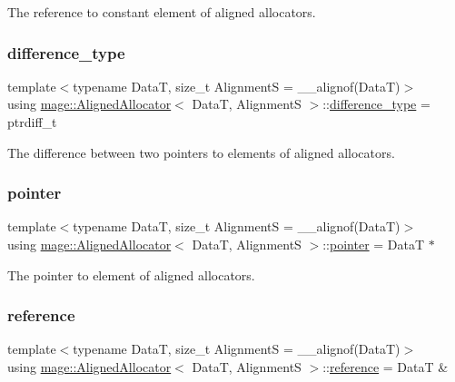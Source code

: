 The reference to constant element of aligned allocators. \hypertarget{structmage_1_1_aligned_allocator_aa66abd74c38e5e565fca600a066a5915}{}\label{structmage_1_1_aligned_allocator_aa66abd74c38e5e565fca600a066a5915} 
\subsubsection{\texorpdfstring{difference\+\_\+type}{difference\_type}}
{\footnotesize\ttfamily template$<$typename DataT, size\+\_\+t AlignmentS = \+\_\+\+\_\+alignof(\+Data\+T)$>$ \\
using \hyperlink{structmage_1_1_aligned_allocator}{mage\+::\+Aligned\+Allocator}$<$ DataT, AlignmentS $>$\+::\hyperlink{structmage_1_1_aligned_allocator_aa66abd74c38e5e565fca600a066a5915}{difference\+\_\+type} =  ptrdiff\+\_\+t}

The difference between two pointers to elements of aligned allocators. \hypertarget{structmage_1_1_aligned_allocator_a4f6b515d4d9d27a8b9e27376302034c4}{}\label{structmage_1_1_aligned_allocator_a4f6b515d4d9d27a8b9e27376302034c4} 
\subsubsection{\texorpdfstring{pointer}{pointer}}
{\footnotesize\ttfamily template$<$typename DataT, size\+\_\+t AlignmentS = \+\_\+\+\_\+alignof(\+Data\+T)$>$ \\
using \hyperlink{structmage_1_1_aligned_allocator}{mage\+::\+Aligned\+Allocator}$<$ DataT, AlignmentS $>$\+::\hyperlink{structmage_1_1_aligned_allocator_a4f6b515d4d9d27a8b9e27376302034c4}{pointer} =  DataT $\ast$}

The pointer to element of aligned allocators. \hypertarget{structmage_1_1_aligned_allocator_a95fd7625632a0143d72ad02ca520be4d}{}\label{structmage_1_1_aligned_allocator_a95fd7625632a0143d72ad02ca520be4d} 
\subsubsection{\texorpdfstring{reference}{reference}}
{\footnotesize\ttfamily template$<$typename DataT, size\+\_\+t AlignmentS = \+\_\+\+\_\+alignof(\+Data\+T)$>$ \\
using \hyperlink{structmage_1_1_aligned_allocator}{mage\+::\+Aligned\+Allocator}$<$ DataT, AlignmentS $>$\+::\hyperlink{structmage_1_1_aligned_allocator_a95fd7625632a0143d72ad02ca520be4d}{reference} =  DataT \&}

